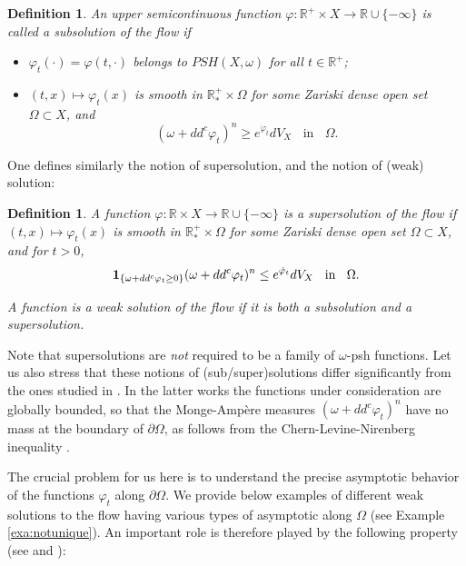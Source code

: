 \documentclass[10pt,a4paper]{amsart}
\numberwithin{equation}{section}
\newtheorem{defi}[theorem]{Definition}
\newcommand{\R}{\mathbb R}
\newcommand{\f}{\varphi}
\begin{document}
\begin{defi}
An upper semicontinuous function $\f: \mathbb R^+ \times X \rightarrow \R \cup \{-\infty\}$ is called a subsolution  of the flow if 
\begin{itemize}
\item $\f_t(\cdot)=\f(t,\cdot)$ belongs to $PSH(X,\omega)$ for all $t \in \R^+$; 
\item $(t,x) \mapsto \f_t(x)$ is smooth in $\R^+_* \times \Omega$ for
some Zariski dense open set $\Omega \subset X$, and
$$
(\omega+dd^c \varphi_{t})^n \geq e^{\dot \varphi_{t}}dV_X
\; \; \text{ in } \; \;
\Omega.
$$
\end{itemize}
\end{defi}




One defines similarly the notion of supersolution, and the notion of (weak) solution: 

 \begin{defi}
A function $\f: \R \times X  \rightarrow \R \cup \{-\infty\}$ is  a supersolution of the flow if 
 $(t,x) \mapsto \f_t(x)$ is smooth in $\R^+_* \times \Omega$ for
some Zariski dense open set $\Omega \subset X$, and for  $t>0$,
$$
{\bf 1}_{\{\omega +dd^c \varphi_t \geq 0\}} (\omega+dd^c \varphi_{t})^n \leq e^{\dot \varphi_{t}}dV_X
\; \; \text{ in } \; \;
\Omega.
$$

A function  is   a weak solution of the flow
if it is both a subsolution and a supersolution.
\end{defi}

Note that supersolutions are {\it not} required to be a family of $\omega$-psh functions.
Let us also stress that these notions of (sub/super)solutions differ significantly
from the ones studied in \cite{GLZ20,GLZ21}. In the latter works the functions under consideration
are globally bounded, so that the Monge-Amp\`ere measures 
$(\omega+dd^c \varphi_{t})^n$ have no mass at the boundary of $\partial \Omega$,
as follows from the Chern-Levine-Nirenberg inequality \cite[Theorem 3.14]{GZbook}.

\smallskip

The crucial problem for us here is to understand the precise asymptotic behavior 
of the functions $\f_t$ along $\partial\Omega$.
We provide below examples of different weak solutions to the flow having various types of
asymptotic along $\Omega$ (see Example \ref{exa:notunique}). 
An important role is therefore played by the following property (see \cite[Theorem 5.8]{DNL17} and \cite[Theorem B]{Dan25}):
\end{document}
